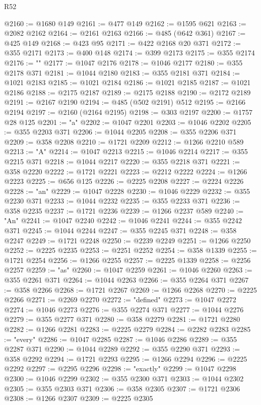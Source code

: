 \begin{lexlean}{R52}
\begin{coremodule}
@2160 := @1680 @149
@2161 := @477 @149
@2162 := @1595 @621
@2163 := @2082 @2162
@2164 := @2161 @2163
@2166 := @485 (@642 @361)
@2167 := @425 @149
@2168 := @423 @95
@2171 := @422 @2168 @20 @371
@2172 := @355 @2171
@2173 := @400 @148
@2174 := @399 @2173
@2175 := @355 @2174
@2176 := ""
@2177 := @1047 @2176
@2178 := @1046 @2177
@2180 := @355 @2178 @371
@2181 := @1044 @2180
@2183 := @355 @2181 @371
@2184 := @1021 @2183
@2185 := @1021 @2184
@2186 := @1021 @2185
@2187 := @1021 @2186
@2188 := @2175 @2187
@2189 := @2175 @2188
@2190 := @2172 @2189
@2191 := @2167 @2190
@2194 := @485 (@502 @2191) @512
@2195 := @2166 @2194
@2197 := @2160 (@2164 @2195)
@2198 := @303 @2197
@2200 := @1757 @28 @125
@2201 := "a"
@2202 := @1047 @2201
@2203 := @1046 @2202
@2205 := @355 @2203 @371
@2206 := @1044 @2205
@2208 := @355 @2206 @371
@2209 := @358 @2208
@2210 := @1721 @2209
@2212 := @1266 @2210 @589
@2213 := "A"
@2214 := @1047 @2213
@2215 := @1046 @2214
@2217 := @355 @2215 @371
@2218 := @1044 @2217
@2220 := @355 @2218 @371
@2221 := @358 @2220
@2222 := @1721 @2221
@2223 := @2212 @2222
@2224 := @1266 @2223
@2225 := @656 @125
@2226 := @2225 @2208
@2227 := @2224 @2226
@2228 := "an"
@2229 := @1047 @2228
@2230 := @1046 @2229
@2232 := @355 @2230 @371
@2233 := @1044 @2232
@2235 := @355 @2233 @371
@2236 := @358 @2235
@2237 := @1721 @2236
@2239 := @1266 @2237 @589
@2240 := "An"
@2241 := @1047 @2240
@2242 := @1046 @2241
@2244 := @355 @2242 @371
@2245 := @1044 @2244
@2247 := @355 @2245 @371
@2248 := @358 @2247
@2249 := @1721 @2248
@2250 := @2239 @2249
@2251 := @1266 @2250
@2252 := @2225 @2235
@2253 := @2251 @2252
@2254 := @358 @1339
@2255 := @1721 @2254
@2256 := @1266 @2255
@2257 := @2225 @1339
@2258 := @2256 @2257
@2259 := "as"
@2260 := @1047 @2259
@2261 := @1046 @2260
@2263 := @355 @2261 @371
@2264 := @1044 @2263
@2266 := @355 @2264 @371
@2267 := @358 @2266
@2268 := @1721 @2267
@2269 := @1266 @2268
@2270 := @2225 @2266
@2271 := @2269 @2270
@2272 := "defined"
@2273 := @1047 @2272
@2274 := @1046 @2273
@2276 := @355 @2274 @371
@2277 := @1044 @2276
@2279 := @355 @2277 @371
@2280 := @358 @2279
@2281 := @1721 @2280
@2282 := @1266 @2281
@2283 := @2225 @2279
@2284 := @2282 @2283
@2285 := "every"
@2286 := @1047 @2285
@2287 := @1046 @2286
@2289 := @355 @2287 @371
@2290 := @1044 @2289
@2292 := @355 @2290 @371
@2293 := @358 @2292
@2294 := @1721 @2293
@2295 := @1266 @2294
@2296 := @2225 @2292
@2297 := @2295 @2296
@2298 := "exactly"
@2299 := @1047 @2298
@2300 := @1046 @2299
@2302 := @355 @2300 @371
@2303 := @1044 @2302
@2305 := @355 @2303 @371
@2306 := @358 @2305
@2307 := @1721 @2306
@2308 := @1266 @2307
@2309 := @2225 @2305

\end{coremodule}
\end{lexlean}
